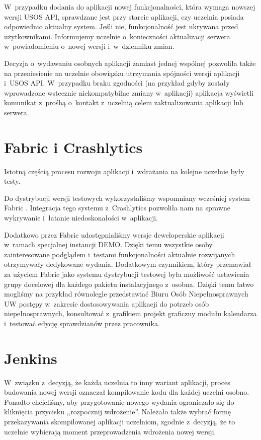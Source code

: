 \documentclass{pracamgr}
\begin{document}
W~przypadku dodania do aplikacji nowej funkcjonalności, która wymaga nowszej wersji USOS API, sprawdzane jest przy starcie
aplikacji, czy uczelnia posiada odpowiednio aktualny system. Jeśli nie, funkcjonalność jest ukrywana przed użytkownikami.
Informujemy uczelnie o~konieczności aktualizacji serwera w~powiadomieniu o~nowej wersji i~w~dzienniku zmian.

Decyzja o~wydawaniu osobnych aplikacji zamiast jednej wspólnej pozwoliła także na przeniesienie na uczelnie obowiązku
utrzymania spójności wersji aplikacji i~USOS API. W~przypadku braku zgodności (na przykład gdyby zostały wprowadzone
wstecznie niekompatybilne zmiany w~aplikacji) aplikacja wyświetli komunikat z~prośbą o~kontakt z~uczelnią celem zaktualizowania
aplikacji lub serwera.

\section{Fabric i Crashlytics}

Istotną częścią procesu rozwoju aplikacji i~wdrażania na kolejne uczelnie były testy.

Do dystrybucji wersji testowych wykorzystaliśmy wspomniany wcześniej system Fabric \cite{fabric}. 
Integracja tego systemu z~Crashlytics pozwoliła nam na sprawne wykrywanie i~łatanie niedoskonałości w~aplikacji.

Dodatkowo przez Fabric udostępnialiśmy wersje deweloperskie aplikacji w~ramach specjalnej instancji DEMO. Dzięki temu
wszystkie osoby zainteresowane podglądem i~testami funkcjonalności aktualnie rozwijanych otrzymywały dedykowane wydania.
Dodatkowym czynnikiem, który przemawiał za użyciem Fabric jako systemu dystrybucji testowej była możliwość ustawienia grupy
docelowej dla każdego pakietu instalacyjnego z~osobna. Dzięki temu łatwo mogliśmy na przykład równolegle przedstawiać
Biuru Osób Niepełnosprawnych UW postępy w~zakresie dostosowywania aplikacji do potrzeb osób niepełnosprawnych, konsultować
z~grafikiem projekt graficzny modułu kalendarza i~testować edycję sprawdzianów przez pracownika.

\section{Jenkins}

W~związku z~decyzją, że każda uczelnia to inny wariant aplikacji, proces budowania nowej wersji oznaczał kompilowanie
kodu dla każdej uczelni osobno. Ponadto chcieliśmy, aby przygotowanie nowego wydania ograniczało się do kliknięcia przycisku
,,rozpocznij wdrożenie''. Należało także wybrać formę przekazywania skompilowanej aplikacji uczelniom, zgodnie
z~decyzją, że to uczelnie wybierają moment przeprowadzenia wdrożenia nowej wersji.
\end{document}
